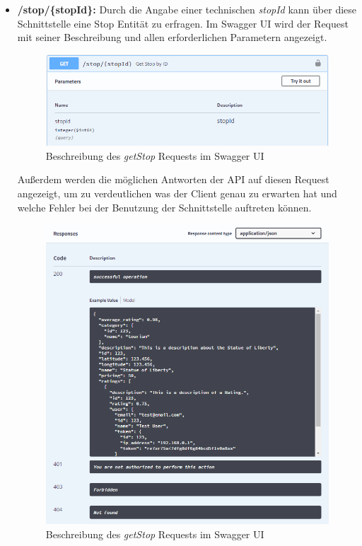 	\begin{itemize}
		\item \textbf{/stop/\{stopId\}:} Durch die Angabe einer technischen \textit{stopId} kann über diese Schnittstelle eine Stop Entität zu erfragen. Im Swagger UI wird der Request mit seiner Beschreibung und allen erforderlichen Parametern angezeigt.  
		
		\begin{figure}[ht!]
			\centering
			\includegraphics[width=1\textwidth]{images/swagger_getStop_head.png}
			\caption{Beschreibung des \textit{getStop} Requests im Swagger UI}
			\label{fig:swagger_getStop_head}
		\end{figure} 
		
		Außerdem werden die möglichen Antworten der API auf diesen Request angezeigt, um zu verdeutlichen was der Client genau zu erwarten hat und welche Fehler bei der Benutzung der Schnittstelle auftreten können.
		
		\begin{figure}[ht!]
			\centering
			\includegraphics[width=1\textwidth]{images/swagger_getStop_response.png}
			\caption{Beschreibung des \textit{getStop} Requests im Swagger UI}
			\label{fig:swagger_getStop_response}
		\end{figure}
	

\end{itemize}
